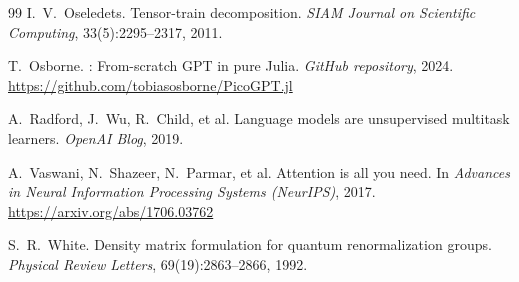 \documentclass[11pt,a4paper]{article}
\theoremstyle{definition}
\begin{document}
\begin{thebibliography}{99}
I.~V.~Oseledets.
\newblock Tensor-train decomposition.
\newblock \emph{SIAM Journal on Scientific Computing}, 33(5):2295--2317, 2011.

T.~Osborne.
: From-scratch {GPT} in pure {Julia}.
\newblock \emph{GitHub repository}, 2024.
\newblock \url{https://github.com/tobiasosborne/PicoGPT.jl}

A.~Radford, J.~Wu, R.~Child, et al.
\newblock Language models are unsupervised multitask learners.
\newblock \emph{OpenAI Blog}, 2019.

A.~Vaswani, N.~Shazeer, N.~Parmar, et al.
\newblock Attention is all you need.
\newblock In \emph{Advances in Neural Information Processing Systems (NeurIPS)}, 2017.
\newblock \url{https://arxiv.org/abs/1706.03762}

S.~R.~White.
\newblock Density matrix formulation for quantum renormalization groups.
\newblock \emph{Physical Review Letters}, 69(19):2863--2866, 1992.

\end{thebibliography}
\end{document}
